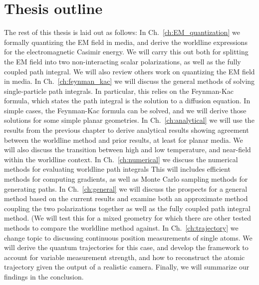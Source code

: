\section{Thesis outline}

The rest of this thesis is laid out as follows:  In Ch.~\ref{ch:EM_quantization} we formally quantizing
the EM field in media, and derive the worldline expressions for the electromagnetic Casimir energy.
We will carry this out both for splitting the EM field into two non-interacting scalar polarizations,
as well as the fully coupled path integral.
We will also review others work on quantizing the EM field in media.
In Ch.~\ref{ch:feynman_kac} we will discuss the general methods of solving single-particle path 
integrals.  In particular, this relies on the Feynman-Kac formula, which states the path integral
 is the solution to a diffusion equation.  In simple cases, the Feynman-Kac formula can be solved,
and we will derive those solutions for some simple planar geometries. 
In Ch.~\ref{ch:analytical} we will use the results from the previous chapter to derive analytical 
results showing agreement between the worldline method and prior results, at least for planar media.
We will also discuss the transition between high and low temperature, and near-field within the
worldline context.  
In Ch.~\ref{ch:numerical} we discuss the numerical methods for evaluating worldline path integrals
This will includes efficient methods for computing gradients, as well as Monte Carlo sampling methods
for generating paths. 
In Ch.~\ref{ch:general} we will discuss the prospects for a general method based on the current
results and examine both an approximate method coupling the two polarizations together as well
as the fully coupled path integral method.  (We will test this for a mixed geometry for which
there are other tested methods to compare the worldline method against. 
In Ch.~\ref{ch:trajectory} we change topic to discussing continuous position measurements 
of single atoms.  We will derive the quantum trajectories for this case, and develop the framework
to account for variable measurement strength, and how to reconstruct the atomic trajectory
given the output of a realistic camera.  
Finally, we will summarize our findings in the conclusion.  





